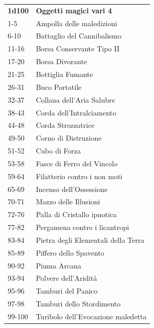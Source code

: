 \begin{multicols}{2}
\begin{tabularx}{0.45\textwidth}{lX}
\textbf{1d100} & \textbf{Oggetti magici vari 4}\\
1-5 &Ampolla delle maledizioni\\
6-10 &Battaglio del Cannibalismo\\
11-16& Borsa Conservante Tipo II\\
17-20& Borsa Divorante\\
21-25& Bottiglia Fumante\\
26-31& Buco Portatile\\
32-37& Collana dell’Aria Salubre\\
38-43& Corda dell'Intralciamento\\
44-48& Corda Strozzatrice\\
49-50& Corno di Distruzione\\
51-52& Cubo di Forza\\
53-58& Fasce di Ferro del Vincolo\\
59-64& Filatterio contro i non moti\\
65-69& Incenso dell’Ossessione\\
70-71& Mazzo delle Illusioni\\
72-76& Palla di Cristallo ipnotica\\
77-82& Pergamena contro i licantropi\\
83-84& Pietra degli Elementali della Terra\\
85-89& Piffero dello Spavento\\
90-92& Piuma Arcana\\
93-94& Polvere dell'Aridità\\
95-96& Tamburi del Panico\\
97-98& Tamburi dello Stordimento\\
99-100& Turibolo dell’Evocazione maledetta\\
\end{tabularx}



\end{multicols}
